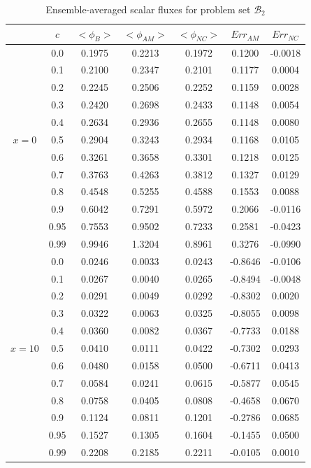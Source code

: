 \documentclass[12pt]{article}
\newcommand{\bl}{\big<}
\newcommand{\bg}{\big>}
\newcommand{\setb}{\mathcal{B}}
\begin{document}
{\begin{table}[p]
\centering
\caption{Ensemble-averaged scalar fluxes for problem set $\setb_2$}
\label{tab6} 
\begin{tabular}{||c|c||c|c|c||c|c||} \hline \hline
  & $c$ & $\bl\phi_B\bg$ & $\bl\phi_{AM}\bg$ &$\bl\phi_{NC}\bg$ & $Err_{AM}$ & $ Err_{NC}$\\ \hline\hline
  & 0.0 & 0.1975 & 0.2213 & 0.1972 & 0.1200 & -0.0018 \\
  \cline{2-7}
  & 0.1 & 0.2100 & 0.2347 & 0.2101 & 0.1177 & 0.0004 \\
  \cline{2-7}
  & 0.2 & 0.2245 & 0.2506 & 0.2252 & 0.1159 & 0.0028 \\
  \cline{2-7}
  & 0.3 & 0.2420 & 0.2698 & 0.2433 & 0.1148 & 0.0054 \\
  \cline{2-7}
  & 0.4 & 0.2634 & 0.2936 & 0.2655 & 0.1148 & 0.0080 \\
  \cline{2-7}
  $x=0$ & 0.5 & 0.2904 & 0.3243 & 0.2934 & 0.1168 & 0.0105 \\
  \cline{2-7}
  & 0.6 & 0.3261 & 0.3658 & 0.3301 & 0.1218 & 0.0125 \\
  \cline{2-7}
  & 0.7 & 0.3763 & 0.4263 & 0.3812 & 0.1327 & 0.0129 \\
  \cline{2-7}
  & 0.8 & 0.4548 & 0.5255 & 0.4588 & 0.1553 & 0.0088 \\
  \cline{2-7}
  & 0.9 & 0.6042 & 0.7291 & 0.5972 & 0.2066 & -0.0116 \\
  \cline{2-7}
  & 0.95 & 0.7553 & 0.9502 & 0.7233 & 0.2581 & -0.0423 \\
\cline{2-7}  
  & 0.99 & 0.9946 & 1.3204 & 0.8961 & 0.3276 & -0.0990 \\
\hline\hline
& 0.0 & 0.0246 & 0.0033 & 0.0243 & -0.8646 & -0.0106 \\
\cline{2-7}  
&0.1 & 0.0267 & 0.0040 & 0.0265 & -0.8494 & -0.0048 \\
\cline{2-7}  
&0.2 & 0.0291 & 0.0049 & 0.0292 & -0.8302 & 0.0020 \\
\cline{2-7}
& 0.3 & 0.0322 & 0.0063 & 0.0325 & -0.8055 & 0.0098 \\
\cline{2-7}
& 0.4 & 0.0360 & 0.0082 & 0.0367 & -0.7733 & 0.0188 \\
\cline{2-7}
$x=10$ & 0.5 & 0.0410 & 0.0111 & 0.0422 & -0.7302 & 0.0293 \\
\cline{2-7}
& 0.6 & 0.0480 & 0.0158 & 0.0500 & -0.6711 & 0.0413 \\
\cline{2-7}
& 0.7 & 0.0584 & 0.0241 & 0.0615 & -0.5877 & 0.0545 \\
\cline{2-7}
& 0.8 & 0.0758 & 0.0405 & 0.0808 & -0.4658 & 0.0670 \\
\cline{2-7}
& 0.9 & 0.1124 & 0.0811 & 0.1201 & -0.2786 & 0.0685 \\
\cline{2-7}
& 0.95 & 0.1527 & 0.1305 & 0.1604 & -0.1455 & 0.0500 \\
\cline{2-7}
& 0.99 & 0.2208 & 0.2185 & 0.2211 & -0.0105 & 0.0010 \\
\hline\hline
  \end{tabular}
\end{table}





}
\end{document}
